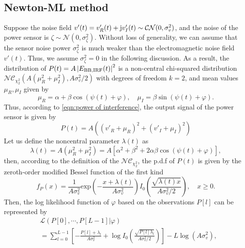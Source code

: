 \documentclass[journal,twocolumn]{IEEEtran}
\theoremstyle{nonumberplain}
\def \exp {\text{exp}}
\def \nc {\mathcal{NC}}
\begin{document}
\subsection{Newton-ML method}  \label{ML method}
    Suppose the noise field $v'(t)=v'_R(t) + {\rm j}v'_I(t)\sim \mathcal{CN}(0, \sigma_v^2)$, and the noise of the power sensor is $\zeta \sim \mathcal{N}(0, \sigma_{\zeta}^2)$. 
    Without loss of generality, we can assume that the sensor noise power $\sigma_{\zeta}^2$ is much weaker than the electromagnetic noise field $v'(t)$.
    Thus, we assume $\sigma_{\zeta}^2=0$ in the following discussion.  
    As a result, the distribution of $P(t) = A\left|E_{{\rm BB}, {\rm IRF}}(t)\right|^2$ is a non-central chi-squared distribution $\nc_{\chi_2^2}(A(\mu_{R}^2+\mu_{I}^2),  A\sigma_v^2/2)$ with degrees of freedom $k=2$, and mean values $\mu_{R}, \mu_{I}$ given by
    \begin{equation}
        \mu_{R} = \alpha + \beta \cos(\psi(t)+\varphi),\quad  \mu_{I}  = \beta \sin(\psi(t)+\varphi).
        \label{chi2 distribution mean values}
    \end{equation}
    Thus, according to \eqref{eqn:power of interference}, the output signal of the power sensor is given by 
    \begin{equation}
        P(t)  = A\left((v'_{R} + \mu_{R})^2 + (v'_{I} + \mu_{I})^2 \right)
        \label{eqn:sensor power}
    \end{equation}
    Let us define the noncentral parameter $\lambda(t)$ as
    \begin{equation}
        \lambda(t)  = A(\mu_{R}^2 + \mu_{I}^2) = A\left[\alpha^{2}+\beta^{2}+2\alpha\beta\cos\left(\psi(t)+\varphi\right)\right],
    \end{equation}
    then, according to the definition of the $\nc_{\chi_2^2}$, the p.d.f of $P(t)$ is given by the zeroth-order modified Bessel function of the first kind 
    \begin{equation}
        f_{P}(x) = \frac{1}{A\sigma_{v}^2} \exp\left(-\frac{x+\lambda(t)}{A\sigma_v^2}\right)I_{0}\left(\frac{\sqrt{\lambda(t) x}}{A\sigma_v^2/2}\right),\quad x \geq 0.
        \label{ML single observation}
    \end{equation}
    Then, the log likelihood function of $\varphi$ based on the observations $P[l]$ can be represented by
    \ifx\onecol\undefined
        \begin{equation}
            \begin{aligned}
                & \mathcal{L}(P[0],\cdots,P[L-1] | \varphi) \\
                & = \sum_{l=0}^{L-1}\left[-\frac{P[l] + \lambda_l}{A\sigma_v^2} + \log I_0\left(\frac{\sqrt{P[l] \lambda_l}}{A\sigma_v^2/2}\right)\right] - L\log(A\sigma_v^2),
            \end{aligned}
            \label{ML likelihood}
        \end{equation}
\end{document}
